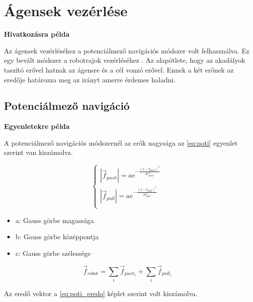 \section{Ágensek vezérlése}

\textbf{Hivatkozásra példa}

Az ágensek vezérléséhez a potenciálmező navigációs módszer volt felhasználva. Ez egy bevált módszer a robotrajok vezérléséhez . Az alapötlete, hogy az akadályok taszító erővel hatnak az ágensre és a cél vonzó erővel. Ennek a két erőnek az eredője határozza meg az irányt amerre érdemes haladni.

\subsection{Potenciálmező navigáció}

\textbf{Egyenletekre példa}

A potenciálmező navigációs módszernél az erők nagysága az \eqref{eq:poti} egyenlet szerint van kiszámolva.

\begin{equation}
    \left\{
    \begin{array}{l}
        |\vec{f}_{push}| = a e ^ {- \frac{(x - b_{push}) ^ {2}}{2 c_{push}^2 }} \\
        |\vec{f}_{pull}| = a e ^ {- \frac{(x - b_{pull}) ^ {2}}{2 c_{pull}^2 }} \\
    \end{array}
    \right.
    \label{eq:poti}
\end{equation}

\begin{itemize}
    \item a: Gauss görbe magassága
    \item b: Gauss görbe középpontja
    \item c: Gauss görbe szélessége
\end{itemize}

\begin{equation}
    \vec{f}_{robot} = \sum_{i} \vec{f}_{push_{i}} + \sum_{i} \vec{f}_{pull_{i}}
    \label{eq:poti_eredo}
\end{equation}

Az eredő vektor a \eqref{eq:poti_eredo} képlet szerint volt kiszámolva. 
